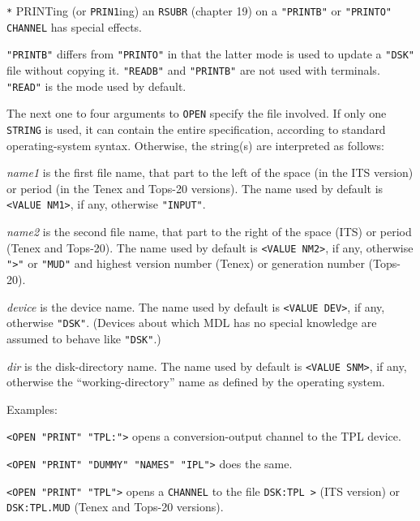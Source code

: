 \documentclass[a4paper,]{article}
\begin{document}
\texttt{*} PRINTing (or \texttt{PRIN1}ing) an \texttt{RSUBR} (chapter 19) on a \texttt{"PRINTB"} or \texttt{"PRINTO"}
\texttt{CHANNEL} has special effects.

\texttt{"PRINTB"} differs from \texttt{"PRINTO"} in that the latter mode is used to update a \texttt{"DSK"}
 file without copying it. \texttt{"READB"} and \texttt{"PRINTB"} are not used with
terminals. \texttt{"READ"} is the mode used by default.

The next one to four arguments to \texttt{OPEN} specify the file involved. If only one \texttt{STRING} is used, it can
contain the entire specification, according to standard operating-system syntax. Otherwise, the string(s) are interpreted
as follows:

\emph{name1} is the first file name, that part to the left of the space (in the ITS  version) or period
(in the Tenex  and Tops-20  versions). The name used by default is
\texttt{\textless{}VALUE\ NM1\textgreater{}}, if any, otherwise \texttt{"INPUT"}.

\emph{name2} is the second file name, that part to the right of the space (ITS) or period (Tenex and Tops-20). The name
used by default is \texttt{\textless{}VALUE\ NM2\textgreater{}}, if any, otherwise
\texttt{"\textgreater{}"}  or \texttt{"MUD"}  and highest
version number (Tenex) or generation number (Tops-20).

\emph{device} is the device name. The name used by default is
\texttt{\textless{}VALUE\ DEV\textgreater{}}, if any, otherwise \texttt{"DSK"}. (Devices about
which MDL has no special knowledge are assumed to behave like \texttt{"DSK"}.)

\emph{dir} is the disk-directory name. The name used by default is
\texttt{\textless{}VALUE\ SNM\textgreater{}}, if any, otherwise the ``working-directory'' name
as defined by the operating system.

Examples:

\texttt{\textless{}OPEN\ "PRINT"\ "TPL:"\textgreater{}} opens a conversion-output channel to the TPL device.

\texttt{\textless{}OPEN\ "PRINT"\ "DUMMY"\ "NAMES"\ "IPL"\textgreater{}} does the same.

\texttt{\textless{}OPEN\ "PRINT"\ "TPL"\textgreater{}} opens a \texttt{CHANNEL} to the file
\texttt{DSK:TPL\ \textgreater{}} (ITS version) or \texttt{DSK:TPL.MUD} (Tenex and Tops-20 versions).
\end{document}
